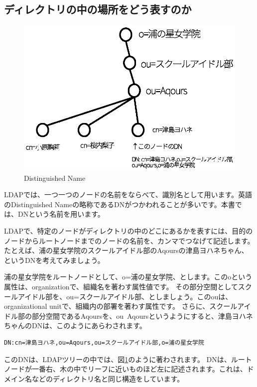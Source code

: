 \subsection{ディレクトリの中の場所をどう表すのか}

\begin{figure}[htbp]
	\includegraphics[width=12cm,clip]{draw/dn.eps}
	\caption{Distinguished Name}
	\label{fig:dn}
\end{figure}

LDAPでは、一つ一つのノードの名前をならべて、識別名として用います。英語のDistinguished Nameの略称であるDNがつかわれることが多いです。本書では、DNという名前を用います。

LDAPで、特定のノードがディレクトリの中のどこにあるかを表すには、目的のノードからルートノードまでのノードの名前を、カンマでつなげて記述します。たとえば、浦の星女学院のスクールアイドル部のAqoursの津島ヨハネちゃん、というDNを考えてみましょう。

浦の星女学院をルートノードとして、o=浦の星女学院、とします。このoという属性は、organizationで、組織名を著わす属性値です。
その部分空間としてスクールアイドル部を、ou=スクールアイドル部、としましょう。このouは、organizational unitで、組織内の部署を著わす属性です。
さらに、スクールアイドル部の部分空間であるAqoursを、ou~Aqoursというようにすると、津島ヨハネちゃんのDNは、このようにあらわされます。

\begin{verbatim}
DN:cn=津島ヨハネ,ou=Aqours,ou=スクールアイドル部,o=浦の星女学院
\end{verbatim}

このDNは、LDAPツリーの中では、図\ref{fig:dn}のように著わされます。
DNは、ルートノードが一番右、木の中でリーフに近いものほど左に記述されます。これは、ドメイン名などのディレクトリ名と同じ構造をしています。

